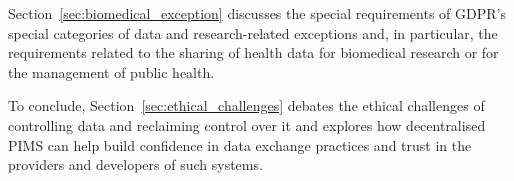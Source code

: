 Section~\ref{sec:biomedical_exception} discusses the special requirements of GDPR's special categories of data and research-related exceptions and, in particular, the requirements related to the sharing of health data for biomedical research or for the management of public health.

To conclude, Section~\ref{sec:ethical_challenges} debates the ethical challenges of controlling data and reclaiming control over it and explores how decentralised PIMS can help build confidence in data exchange practices and trust in the providers and developers of such systems.





